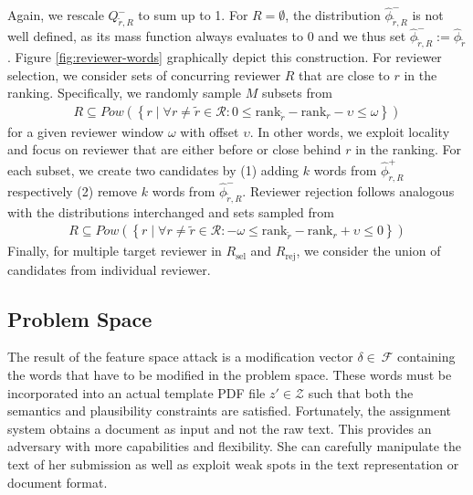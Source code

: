 \documentclass[letterpaper,twocolumn,10pt]{article}
\newcommand{\reviewersset}{\mathcal{R}}
\newcommand{\reviewersubset}{R}
\newcommand{\surroundingreviewers}{R}
\newcommand{\reviewer}{r}
\newcommand{\select}{\text{sel}}
\newcommand{\reject}{\text{rej}}
\newcommand{\requestedreviewers}{\reviewersubset_{\select}}
\newcommand{\rejectedreviewers}{\reviewersubset_{\reject}}
\newcommand{\reviewerwindow}{\omega}
\newcommand{\revieweroffset}{\upsilon}
\newcommand{\reviewerwordsmass}{Q}
\newcommand{\reviewerwords}{\hat{\topicworddist}}
\newcommand{\stepsize}{k}
\newcommand{\nosuccessors}{M}
\newcommand{\topicworddist}{\phi}
\newcommand{\modifications}{\delta}
\newcommand{\Dom}{\ensuremath{\mathcal{Z}}\xspace}
\newcommand{\F}{\ensuremath{\mathcal{F}}\xspace}
\newcommand{\inputpdf}{\ensuremath{z}\xspace}
\begin{document}
Again, we rescale $\reviewerwordsmass^-_{\tilde{\reviewer}, \surroundingreviewers}$ to sum up to 1. For $\surroundingreviewers = \emptyset$, the distribution $\reviewerwords^-_{\tilde{\reviewer}, \surroundingreviewers}$ is not well defined, as its mass function always evaluates to 0 and we thus set $\reviewerwords^-_{\tilde{\reviewer}, \surroundingreviewers} := \reviewerwords_{\tilde{\reviewer}}$. Figure \ref{fig:reviewer-words} graphically depict this construction.
For reviewer selection, we consider sets of concurring reviewer $\surroundingreviewers$ that are close to $\reviewer$ in the ranking. Specifically, we randomly sample $\nosuccessors$ subsets from
\begin{align*}
\surroundingreviewers \subseteq Pow(\left \{ \reviewer \mid \forall \reviewer \neq \tilde{\reviewer} \in \reviewersset: 0 \leq \text{rank}_{\tilde{\reviewer}} - \text{rank}_{\reviewer} - \revieweroffset \leq \reviewerwindow \right \})
\end{align*}
for a given reviewer window $\reviewerwindow$ with offset $\revieweroffset$. In other words, we exploit locality and focus on reviewer that are either before or close behind $\reviewer$ in the ranking.
For each subset, we create two candidates by (1) adding $\stepsize$ words from $\reviewerwords^+_{\tilde{\reviewer}, \surroundingreviewers}$ respectively (2) remove $\stepsize$ words from $\reviewerwords^-_{\tilde{\reviewer}, \surroundingreviewers}$. 
Reviewer rejection follows analogous with the distributions interchanged and sets sampled from
\begin{align*}
\surroundingreviewers \subseteq Pow(\left \{ \reviewer \mid \forall \reviewer \neq \tilde{\reviewer} \in \reviewersset: -\reviewerwindow \leq \text{rank}_{\tilde{\reviewer}} - \text{rank}_{\reviewer} + \revieweroffset \leq 0 \right \})
\end{align*}
Finally, for multiple target reviewer in $\requestedreviewers$ and $\rejectedreviewers$, we  consider the union of candidates from individual reviewer.

\subsection{Problem Space}
\label{sec:problem-space}

The result of the feature space attack is a modification vector $\modifications \in~\F$ containing the words that have to be modified in the problem space. These words must be incorporated into an actual template PDF file $\inputpdf' \in \Dom$ such that both the semantics and plausibility constraints are satisfied. 
Fortunately, the assignment system obtains a document as input and not the raw text. This provides an adversary with more capabilities and flexibility. She can carefully manipulate the text of her submission as well as exploit weak spots in the text representation or document format.
\end{document}
